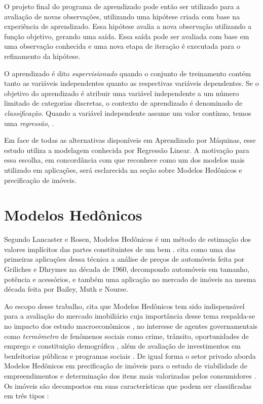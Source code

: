 O projeto final do programa de aprendizado pode então ser utilizado para a avaliação de novas observações, utilizando uma hipótese criada com  base na experiência de aprendizado. Essa hipótese avalia a nova observação utilizando a função objetivo, gerando uma saída. Essa saída pode ser avaliada com base em uma observação conhecida e uma nova etapa de iteração é executada para o refinamento da hipótese. 

O aprendizado é dito \textit{supervisionado} quando o conjunto de treinamento contém tanto as variáveis independentes quanto as respectivas variáveis dependentes. Se o objetivo do aprendizado é atribuir uma variável independente a um número limitado de categorias discretas, o contexto de aprendizado é denominado de \textit{classificação}. Quando a variável independente assume um valor contínuo, temos uma \textit{regressão}, \cite[p.3,p.xi]{Bishop, Hastie}.


Em face de todas as alternativas disponíveis em Aprendizado por Máquinas, esse estudo utiliza a modelagem conhecida por Regressão Linear. A motivação para essa escolha, em concordância com \cite[p.50]{Murphy} que reconhece como um dos modelos mais utilizado em aplicações, será esclarecida na seção sobre Modelos Hedônicos e precificação de imóveis. 


\fi

\section{Modelos Hedônicos}\label{sec:model_hedonico}

Segundo Lancaster e Rosen, Modelos Hedônicos é um método de estimação dos valores implícitos das partes constituintes de um bem \cite{Long}. \cite{Macedo} cita como uma das primeiras aplicações dessa técnica a análise de preços de automóveis feita por Griliches e Dhrymes na década de 1960, decompondo automóveis em tamanho, potência e acessórios, e também uma aplicação no mercado de imóveis na mesma década feita por Bailey, Muth e Nourse. 

Ao escopo desse trabalho, \cite{Long} cita que Modelos Hedônicos tem sido indispensável para a avaliação do mercado imobiliário cuja importância desse tema respalda-se no impacto dos estudo macroeconômicos , no interesse de agentes governamentais como \textit{termômetro} de fenômenos sociais como crime, trânsito, oportunidades de emprego e constituição demográfica \cite{IsmailMacGregor}, além de avaliação de investimentos em benfeitorias públicas e programas sociais \cite{Long}. De igual forma o setor privado aborda Modelos Hedônicos em precificação de imóveis para o estudo de viabilidade de empreendimentos e determinação dos itens mais valorizadas pelos consumidores \cite{Neto}. Os imóveis são decompostos em suas características que podem ser classificadas em três tipos \cite[p.3]{Long}: 

